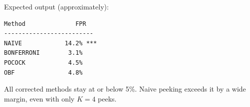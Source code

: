 \documentclass[12pt, a4paper]{article}
\begin{document}
\begin{plainlanguage}
Expected output (approximately):
\begin{verbatim}
Method              FPR
-------------------------
NAIVE            14.2% ***
BONFERRONI        3.1%
POCOCK            4.5%
OBF               4.8%
\end{verbatim}
All corrected methods stay at or below 5\%.  Naive peeking exceeds it by
a wide margin, even with only $K = 4$ peeks.
\end{plainlanguage}
\end{document}
